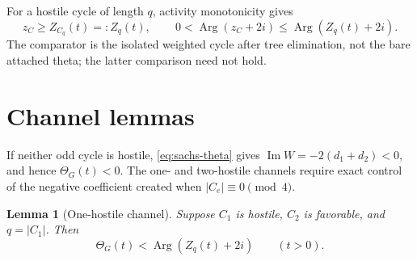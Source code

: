 \documentclass[11pt]{article}
\newtheorem{lemma}[theorem]{Lemma}
\theoremstyle{remark}
\newcommand{\Arg}{\operatorname{Arg}}
\begin{document}
For a hostile cycle of length $q$, activity monotonicity gives
\begin{equation}\label{eq:weighted-cycle}
 z_C\geq Z_{C_q}(t)=:Z_q(t),
 \,\qquad
 0<\Arg(z_C+2i)\leq\Arg(Z_q(t)+2i).
\end{equation}
The comparator is the isolated weighted cycle after tree elimination, not the
bare attached theta; the latter comparison need not hold.

\section{Channel lemmas}

If neither odd cycle is hostile, \eqref{eq:sachs-theta} gives
$\operatorname{Im}W=-2(d_1+d_2)<0$, and hence $\Theta_G(t)<0$.  The one- and
two-hostile channels require exact control of the negative coefficient created
when $|C_e|\equiv0\pmod4$.

\begin{lemma}[One-hostile channel]\label{lem:one}
Suppose $C_1$ is hostile, $C_2$ is favorable, and $q=|C_1|$.  Then
\begin{equation}\label{eq:one-phase}
 \Theta_G(t)<\Arg(Z_q(t)+2i)\qquad(t>0).
\end{equation}
\end{lemma}
\end{document}
